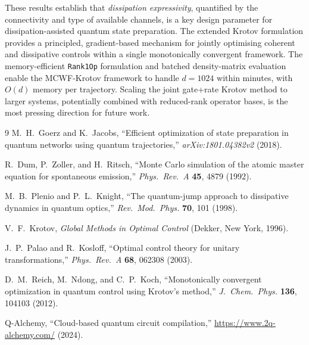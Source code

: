 \documentclass[11pt,a4paper]{article}
\begin{document}
These results establish that \emph{dissipation expressivity}, quantified
by the connectivity and type of available channels, is a key design
parameter for dissipation-assisted quantum state preparation.  The
extended Krotov formulation provides a principled, gradient-based
mechanism for jointly optimising coherent and dissipative controls within
a single monotonically convergent framework.  The memory-efficient
\texttt{Rank1Op} formulation and batched density-matrix evaluation
enable the MCWF-Krotov framework to handle $d = 1024$ within minutes,
with $O(d)$ memory per trajectory.  Scaling the joint gate+rate Krotov
method to larger systems, potentially combined with reduced-rank
operator bases, is the most pressing direction for future work.


\begin{thebibliography}{9}
M.~H.~Goerz and K.~Jacobs,
``Efficient optimization of state preparation in quantum networks
using quantum trajectories,''
\emph{arXiv:1801.04382v2} (2018).

R.~Dum, P.~Zoller, and H.~Ritsch,
``Monte Carlo simulation of the atomic master equation for
spontaneous emission,''
\emph{Phys.~Rev.~A} \textbf{45}, 4879 (1992).

M.~B.~Plenio and P.~L.~Knight,
``The quantum-jump approach to dissipative dynamics in quantum optics,''
\emph{Rev.~Mod.~Phys.} \textbf{70}, 101 (1998).

V.~F.~Krotov,
\emph{Global Methods in Optimal Control} (Dekker, New York, 1996).

J.~P.~Palao and R.~Kosloff,
``Optimal control theory for unitary transformations,''
\emph{Phys.~Rev.~A} \textbf{68}, 062308 (2003).

D.~M.~Reich, M.~Ndong, and C.~P.~Koch,
``Monotonically convergent optimization in quantum control using
Krotov's method,''
\emph{J.~Chem.~Phys.} \textbf{136}, 104103 (2012).

Q-Alchemy,
``Cloud-based quantum circuit compilation,''
\url{https://www.2q-alchemy.com/} (2024).
\end{thebibliography}
\end{document}

